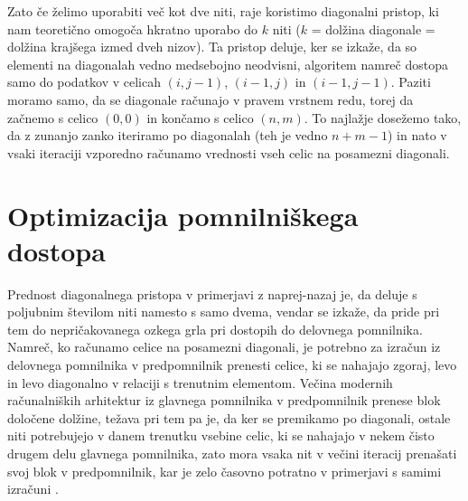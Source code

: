 \documentclass[a4paper,12pt,openright]{book}
\begin{document}
Zato če želimo uporabiti več kot dve niti, raje koristimo diagonalni pristop, ki nam teoretično omogoča hkratno uporabo do $k$ niti ($k$ = dolžina diagonale = dolžina krajšega izmed dveh nizov). Ta pristop deluje, ker se izkaže, da so elementi na diagonalah vedno medsebojno neodvisni, algoritem namreč dostopa samo do podatkov v celicah $(i, j-1)$, $(i-1, j)$ in $(i-1, j-1)$. Paziti moramo samo, da se diagonale računajo v pravem vrstnem redu, torej da začnemo s celico $(0, 0)$ in končamo s celico $(n, m)$. To najlažje dosežemo tako, da z zunanjo zanko iteriramo po diagonalah (teh je vedno $n+m-1$) in nato v vsaki iteraciji vzporedno računamo vrednosti vseh celic na posamezni diagonali. 

\section{Optimizacija pomnilniškega dostopa}

Prednost diagonalnega pristopa v primerjavi z naprej-nazaj je, da deluje s poljubnim številom niti namesto s samo dvema, vendar se izkaže, da pride pri tem do nepričakovanega ozkega grla pri dostopih do delovnega pomnilnika. Namreč, ko računamo celice na posamezni diagonali, je potrebno za izračun iz delovnega pomnilnika v predpomnilnik prenesti celice, ki se nahajajo zgoraj, levo in levo diagonalno v relaciji s trenutnim elementom. Večina modernih računalniških arhitektur iz glavnega pomnilnika v predpomnilnik prenese blok določene dolžine, težava pri tem pa je, da ker se premikamo po diagonali, ostale niti potrebujejo v danem trenutku vsebine celic, ki se nahajajo v nekem čisto drugem delu glavnega pomnilnika, zato mora vsaka nit v večini iteracij prenašati svoj blok v predpomnilnik, kar je zelo časovno potratno v primerjavi s samimi izračuni \cite{bottleneck}. 

\bigskip
\bigskip
\end{document}
